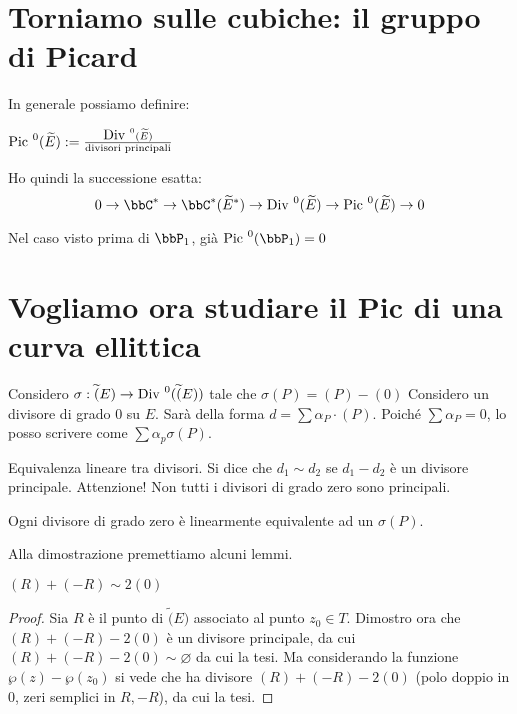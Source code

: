 \section{Torniamo sulle cubiche: il gruppo di Picard}
In generale possiamo definire:

\begin{definizione}
$\mbox{Pic }^0(\widetilde{E}) := \frac{\mbox{Div }^0(\widetilde{E})}{\text{divisori principali}}$
\end{definizione}

\begin{osservazione}
Ho quindi la successione esatta:
$$0 \rightarrow \bbC^* \rightarrow \bbC^*(\widetilde{E}^*) \rightarrow \Div^0(\widetilde{E})\rightarrow \Pic^0(\widetilde{E})\rightarrow 0$$
\end{osservazione}

Nel caso visto prima di $\bbP_1$, già $\Pic^0(\bbP_1)=0$


\section{Vogliamo ora studiare il Pic di una curva ellittica}

Considero $\sigma : \widetilde(E) \rightarrow \mbox{Div }^0(\widetilde(E))$ tale che $\sigma(P)=(P)-(0)$
Considero un divisore di grado $0$ su $E$. Sarà della forma $d = \sum\alpha_P\cdot(P)$.
Poiché $\sum \alpha_P=0$, lo posso scrivere come $\sum\alpha_p \sigma(P)$.

\begin{definizione}
Equivalenza lineare tra divisori. Si dice che $d_1 \sim d_2$ se $d_1-d_2$ è un divisore principale. Attenzione! Non tutti i divisori di grado zero sono principali.
\end{definizione}

\begin{teorema}
Ogni divisore di grado zero è linearmente equivalente ad un $\sigma(P)$.
\end{teorema}

Alla dimostrazione premettiamo alcuni lemmi. 
\begin{lemma}
$(R) + (-R) \sim 2(0)$
\end{lemma}
\begin{proof}
Sia $R$ è il punto di $\widetilde(E)$ associato al punto $z_0 \in T$.
Dimostro ora che $(R)+(-R)-2(0)$ è un divisore principale, da cui $(R)+(-R)-2(0) \sim \varnothing$ da cui la tesi.
Ma considerando la funzione $\wp(z)-\wp(z_0)$ si vede che ha divisore $(R)+(-R)-2(0)$ (polo doppio in $0$, zeri semplici in $R,-R$), da cui la tesi.
\end{proof}


